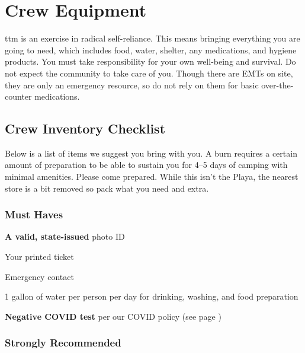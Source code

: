 \section*{Crew Equipment}
\gls{ttm} is an exercise in radical self-reliance.  This means bringing everything you are going to need, which includes food, water, shelter, any medications, and hygiene products.  You must take responsibility for your own well-being and survival.  Do not expect the community to take care of you.  Though there are EMTs on site, they are only an emergency resource, so do not rely on them for basic over-the-counter medications.

\subsection*{Crew Inventory Checklist}
Below is a list of items we suggest you bring with you.  A burn requires a certain amount of preparation to be able to sustain you for 4--5 days of camping with minimal amenities. Please come prepared.  While this isn't the Playa, the nearest store is a bit removed so pack what you need and extra.  


\subsubsection*{Must Haves}

\begin{multicols}{2}

\begin{checklist}
	\item \textbf{A valid, state-issued} photo ID
    \item Your printed ticket
    \item Emergency contact
    \item  1 gallon of water per person per day for drinking, washing, and food preparation
    \item \textbf{Negative COVID test} per our COVID policy (see page \pageref{covid-policy})
\end{checklist}
\end{multicols}

\subsubsection*{Strongly Recommended}


